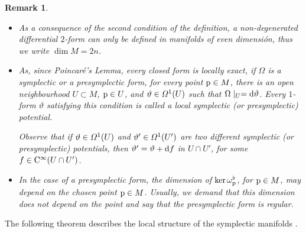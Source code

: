 \documentclass[12pt]{report}
\newtheorem{remark}[teor]{Remark}
\def\d{{\rm d}}
\def\Cinfty{{\rm C}^\infty}
\begin{document}
\begin{remark}{\rm 
\begin{itemize}
\item
As a consequence of the second condition of the definition, a non-degenerated differential $2$-form
can only be defined in manifolds of even dimensi\'on,
thus we write $\dim M = 2n$.
\item
As, since {\sl Poincar\'e's Lemma}, every closed form is locally exact,
if $\Omega$ is a symplectic or a presymplectic form, for every point
${\rm p}\in M$, there is an open neighbourhood
$U \subset M$, ${\rm p}\in U$, and $\vartheta \in {\mit\Omega}^1(U)$ such that
$\Omega\mid_U=\d\vartheta$.
Every $1$-form $\vartheta$ satisfying this condition is called a
{\sl local symplectic ({\rm or} presymplectic) potential}.

Observe that if $\vartheta \in {\mit\Omega}^1(U)$
and $\vartheta ' \in {\mit\Omega}^1(U')$ are two different symplectic
(or presymplectic) potentials, then $\vartheta ' = \vartheta + \d f$
in $U\cap U'$, for some $f \in \Cinfty(U\cap U')$.
\item 
In the case of a presymplectic form, the dimension of $\ker \omega_{\rm p}^{\flat}$, for ${\rm p}\in M$, may depend on the chosen point ${\rm p}\in M$. Usually, we demand that this dimension does not depend on the point and say that the presymplectic form is {\sl regular}.
\end{itemize}
}\end{remark}

The following theorem describes the local structure of the symplectic manifolds \cite{Darboux}.
\end{document}
